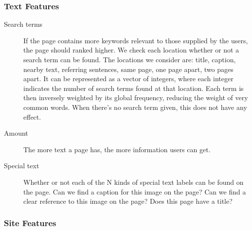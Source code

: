 \documentclass{www2010-submission}
\begin{document}
\subsubsection{Text Features}

\begin{description}


\item[Search terms]
If the page contains more keywords relevant to those supplied by
the users, the page should ranked higher. We check each location
whether or not a search term can be found. The locations we
consider are: title, caption, nearby text, referring sentences,
same page, one page apart, two pages apart. It can be represented
as a vector of integers, where each integer indicates the number
of search terms found at that location. Each term is then
inversely weighted by its global frequency, reducing the weight of
very common words. When there's no search term given, this does
not have any effect.


\item[Amount]
The more text a page has, the more information users can get.

\item[Special text]
Whether or not each of the N kinds of special text labels can be
found on the page. Can we find a caption for this image on the
page? Can we find a clear reference to this image on the page?
Does this page have a title?

\end{description}

\subsubsection{Site Features}
\end{document}
